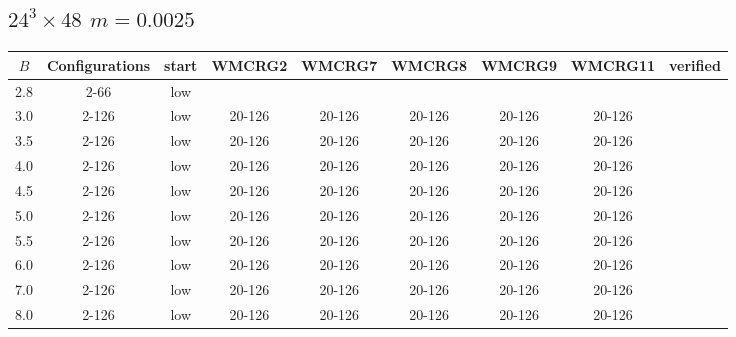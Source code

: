 \documentclass{article}
\begin{document}
\begin{center}
  \section*{$24^3\times48$  $m=0.0025$}
    \begin{center}
    \begin{tabular}{| c | c | c | c | c | c | c | c | c |}
      \hline
      $B$ & Configurations & start & WMCRG2 & WMCRG7 & WMCRG8 & WMCRG9 & WMCRG11 & verified\\
      \hline
      2.8 & 2-66  & low &  &  &  &  &  &\\
      3.0 & 2-126 & low & 20-126 & 20-126 & 20-126 & 20-126 & 20-126 &\\
      3.5 & 2-126 & low & 20-126 & 20-126 & 20-126 & 20-126 & 20-126 &\\
      4.0 & 2-126 & low & 20-126 & 20-126 & 20-126 & 20-126 & 20-126 &\\
      4.5 & 2-126 & low & 20-126 & 20-126 & 20-126 & 20-126 & 20-126 &\\
      5.0 & 2-126 & low & 20-126 & 20-126 & 20-126 & 20-126 & 20-126 &\\
      5.5 & 2-126 & low & 20-126 & 20-126 & 20-126 & 20-126 & 20-126 &\\
      6.0 & 2-126 & low & 20-126 & 20-126 & 20-126 & 20-126 & 20-126 &\\ %
      7.0 & 2-126 & low & 20-126 & 20-126 & 20-126 & 20-126 & 20-126 &\\ %
      8.0 & 2-126 & low & 20-126 & 20-126 & 20-126 & 20-126 & 20-126 &\\
      \hline
    \end{tabular}
    \end{center}

\end{center}
\end{document}
